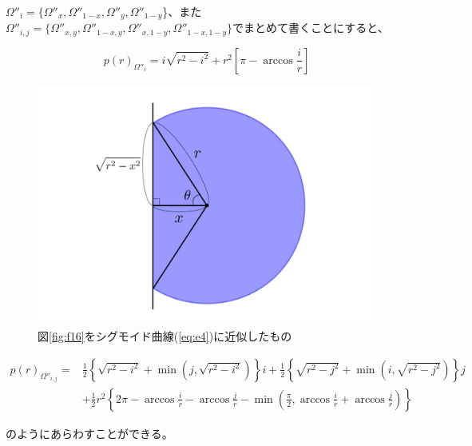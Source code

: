 $\Omega''_{i} = \{\Omega''_{x}, \Omega''_{1-x}, \Omega''_{y}, \Omega''_{1-y}$\}、また$\Omega''_{i,j} = \{\Omega''_{x,y}, \Omega''_{1-x,y}, \Omega''_{x,1-y}, \Omega''_{1-x,1-y}\}$でまとめて書くことにすると、

$$p(r)_{\Omega''_{i}} = i \sqrt{r^{2}-i^{2}} + r^{2} \left[ \pi -\arccos \frac{i}{r} \right]$$

\begin{figure}[H]
    \begin{center}
        \includegraphics[width=12.5cm]{../img/omega_x.jpg}
        \caption{図\ref{fig:f16}をシグモイド曲線(\ref{eq:e4})に近似したもの}
        \label{fig:f21}
    \end{center}
\end{figure}

\begin{align}p(r)_{\Omega''_{i,j}} = &\frac{1}{2}\left\{ \sqrt{r^{2}-i^{2}} + \min \left(j, \sqrt{r^{2}-i^{2}}\right) \right\}i + \frac{1}{2}\left\{ \sqrt{r^{2}-j^{2}} + \min \left( i, \sqrt{r^{2}-j^{2}}\right) \right\}j \nonumber \\
&+ \frac{1}{2}r^{2} \left\{ 2\pi -\arccos \frac{i}{r}-\arccos \frac{j}{r}-\min \left( \frac{\pi}{2}, \arccos \frac{i}{r} +\arccos \frac{j}{r} \right) \right\}
\end{align}

のようにあらわすことができる。

